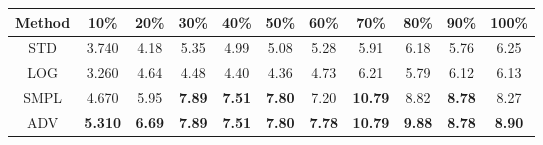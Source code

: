 \documentclass{standalone}
\begin{document}
\begin{tabular}{c|cccccccccc}
      \toprule
      Method & 10\% & 20\% & 30\% & 40\% & 50\% & 60\% & 70\% & 80\% & 90\% & 100\% \\
      \midrule
STD & 3.740 & 4.18 & 5.35 & 4.99 & 5.08 & 5.28 & 5.91 & 6.18 & 5.76 & 6.25\\
LOG & 3.260 & 4.64 & 4.48 & 4.40 & 4.36 & 4.73 & 6.21 & 5.79 & 6.12 & 6.13\\
SMPL & 4.670 & 5.95 & \textbf{7.89} & \textbf{7.51} & \textbf{7.80} & 7.20 & \textbf{10.79} & 8.82 & \textbf{8.78} & 8.27\\
ADV & \textbf{5.310} & \textbf{6.69} & \textbf{7.89} & \textbf{7.51} & \textbf{7.80} & \textbf{7.78} & \textbf{10.79} & \textbf{9.88} & \textbf{8.78} & \textbf{8.90}\\
  \bottomrule
\end{tabular}
\end{document}
